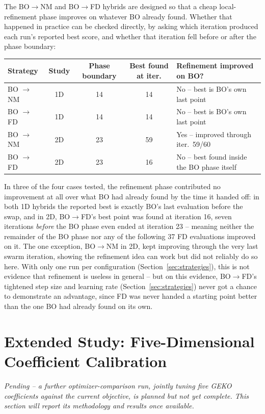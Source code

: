 The BO$\to$NM and BO$\to$FD hybrids are designed so that a cheap
local-refinement phase improves on whatever BO already found. Whether that
happened in practice can be checked directly, by asking which iteration
produced each run's reported best score, and whether that iteration fell
before or after the phase boundary:

\begin{center}
\begin{tabular}{@{}lcccl@{}}
\toprule
Strategy & Study & Phase boundary & Best found at iter. & Refinement improved on BO? \\
\midrule
BO $\to$ NM & 1D & 14 & 14 & No -- best is BO's own last point \\
BO $\to$ FD & 1D & 14 & 14 & No -- best is BO's own last point \\
BO $\to$ NM & 2D & 23 & 59 & Yes -- improved through iter.\ 59/60 \\
BO $\to$ FD & 2D & 23 & 16 & No -- best found inside the BO phase itself \\
\bottomrule
\end{tabular}
\end{center}

In three of the four cases tested, the refinement phase contributed no
improvement at all over what BO had already found by the time it handed off:
in both 1D hybrids the reported best is exactly BO's last evaluation before the
swap, and in 2D, BO$\to$FD's best point was found at iteration 16, seven
iterations \emph{before} the BO phase even ended at iteration 23 -- meaning
neither the remainder of the BO phase nor any of the following 37 FD
evaluations improved on it. The one exception, BO$\to$NM in 2D, kept improving
through the very last swarm iteration, showing the refinement idea can work but
did not reliably do so here. With only one run per configuration
(Section~\ref{sec:strategies}), this is not evidence that refinement is
useless in general -- but on this evidence, BO$\to$FD's tightened step size and
learning rate (Section~\ref{sec:strategies}) never got a chance to demonstrate
an advantage, since FD was never handed a starting point better than the one BO
had already found on its own.

\section{Extended Study: Five-Dimensional Coefficient Calibration}
\label{sec:results-5d}

\textit{Pending -- a further optimizer-comparison run, jointly tuning five GEKO
coefficients against the current objective, is planned but not yet complete.
This section will report its methodology and results once available.}

